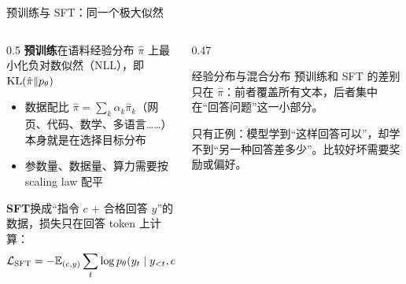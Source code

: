 \documentclass[aspectratio=169,10pt,UTF8,fontset=none]{ctexbeamer}
\begin{document}
\begin{frame}{预训练与 SFT：同一个极大似然}
  \begin{columns}[T]
    \begin{column}{0.5\textwidth}
      \textbf{预训练}\quad 在语料经验分布 $\hat\pi$ 上最小化负对数似然（NLL），即 $\mathrm{KL}(\hat\pi\Vert p_\theta)$
      \begin{itemize}
        \item 数据配比 $\hat\pi=\sum_k\alpha_k\hat\pi_k$（网页、代码、数学、多语言……）本身就是在选择目标分布
        \item 参数量、数据量、算力需要按 scaling law 配平
      \end{itemize}
      \vspace{1mm}
      \textbf{SFT}\quad 换成“指令 $c$ + 合格回答 $y$”的数据，损失只在回答 token 上计算：
      \[
        \mathcal L_{\mathrm{SFT}}=-\mathbb{E}_{(c,y)}\sum_t\log p_\theta(y_t\mid y_{<t},c)
      \]
    \end{column}
    \begin{column}{0.47\textwidth}
      \begin{concept}{经验分布与混合分布}
        预训练和 SFT 的差别只在 $\hat\pi$：前者覆盖所有文本，后者集中在“回答问题”这一小部分。
      \end{concept}
      \vspace{1mm}
      \begin{caution}只有正例：模型学到“这样回答可以”，却学不到“另一种回答差多少”。比较好坏需要奖励或偏好。\end{caution}
    \end{column}
  \end{columns}
\end{frame}
\end{document}
